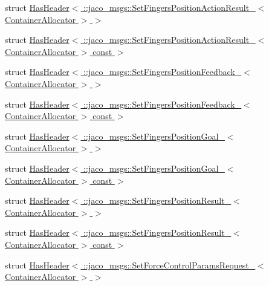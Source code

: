 \begin{DoxyCompactItemize}
\item 
struct \hyperlink{structros_1_1message__traits_1_1HasHeader_3_01_1_1jaco__msgs_1_1SetFingersPositionActionResult__2e85c66de02b41802b0f52d162e48290}{Has\+Header$<$ \+::jaco\+\_\+msgs\+::\+Set\+Fingers\+Position\+Action\+Result\+\_\+$<$ Container\+Allocator $>$ $>$}
\item 
struct \hyperlink{structros_1_1message__traits_1_1HasHeader_3_01_1_1jaco__msgs_1_1SetFingersPositionActionResult__48c09174784ce87d80d2aed37fbf5199}{Has\+Header$<$ \+::jaco\+\_\+msgs\+::\+Set\+Fingers\+Position\+Action\+Result\+\_\+$<$ Container\+Allocator $>$ const  $>$}
\item 
struct \hyperlink{structros_1_1message__traits_1_1HasHeader_3_01_1_1jaco__msgs_1_1SetFingersPositionFeedback___3_01ContainerAllocator_01_4_01_4}{Has\+Header$<$ \+::jaco\+\_\+msgs\+::\+Set\+Fingers\+Position\+Feedback\+\_\+$<$ Container\+Allocator $>$ $>$}
\item 
struct \hyperlink{structros_1_1message__traits_1_1HasHeader_3_01_1_1jaco__msgs_1_1SetFingersPositionFeedback___3_0d8621333826f4a008548deb6818c77ae}{Has\+Header$<$ \+::jaco\+\_\+msgs\+::\+Set\+Fingers\+Position\+Feedback\+\_\+$<$ Container\+Allocator $>$ const  $>$}
\item 
struct \hyperlink{structros_1_1message__traits_1_1HasHeader_3_01_1_1jaco__msgs_1_1SetFingersPositionGoal___3_01ContainerAllocator_01_4_01_4}{Has\+Header$<$ \+::jaco\+\_\+msgs\+::\+Set\+Fingers\+Position\+Goal\+\_\+$<$ Container\+Allocator $>$ $>$}
\item 
struct \hyperlink{structros_1_1message__traits_1_1HasHeader_3_01_1_1jaco__msgs_1_1SetFingersPositionGoal___3_01Con6003a1317d2bf6774871b870a173bdcc}{Has\+Header$<$ \+::jaco\+\_\+msgs\+::\+Set\+Fingers\+Position\+Goal\+\_\+$<$ Container\+Allocator $>$ const  $>$}
\item 
struct \hyperlink{structros_1_1message__traits_1_1HasHeader_3_01_1_1jaco__msgs_1_1SetFingersPositionResult___3_01ContainerAllocator_01_4_01_4}{Has\+Header$<$ \+::jaco\+\_\+msgs\+::\+Set\+Fingers\+Position\+Result\+\_\+$<$ Container\+Allocator $>$ $>$}
\item 
struct \hyperlink{structros_1_1message__traits_1_1HasHeader_3_01_1_1jaco__msgs_1_1SetFingersPositionResult___3_01C7c96f7e9abc0e8d5d71906925dacf2e7}{Has\+Header$<$ \+::jaco\+\_\+msgs\+::\+Set\+Fingers\+Position\+Result\+\_\+$<$ Container\+Allocator $>$ const  $>$}
\item 
struct \hyperlink{structros_1_1message__traits_1_1HasHeader_3_01_1_1jaco__msgs_1_1SetForceControlParamsRequest___3_01ContainerAllocator_01_4_01_4}{Has\+Header$<$ \+::jaco\+\_\+msgs\+::\+Set\+Force\+Control\+Params\+Request\+\_\+$<$ Container\+Allocator $>$ $>$}

\end{DoxyCompactItemize}
